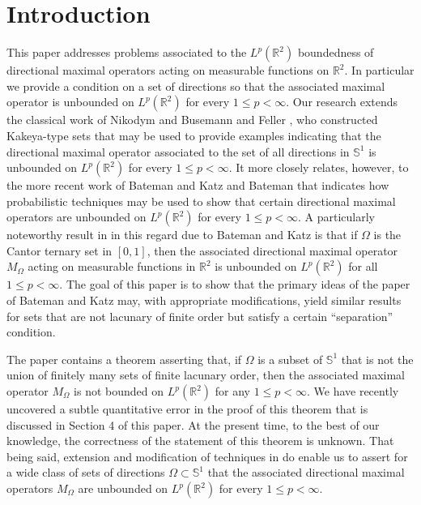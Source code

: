 \documentclass[12pt]{amsart}
\numberwithin{equation}{section}
\theoremstyle{definition}
\theoremstyle{remark}
\begin{document}
\section{Introduction}
This paper addresses problems associated to the $L^p(\mathbb{R}^2)$ boundedness of directional \mbox{maximal} operators acting on measurable functions on $\mathbb{R}^2$.  In particular we provide a condition on a set of directions so that the associated maximal operator is unbounded on $L^p(\mathbb{R}^2)$ for every $1 \leq p < \infty$.   Our research extends the classical work of Nikodym \cite{nikodym} and Busemann and Feller \cite{bf1934},  who constructed  Kakeya-type sets that may be used to provide examples indicating that the directional maximal operator associated to the set of all directions in $\mathbb{S}^{1}$ is unbounded on $L^p(\mathbb{R}^2)$ for every $1 \leq p < \infty$.  It more closely relates, however, to the more recent work of Bateman and Katz \cite{KB} and Bateman \cite{Ba} that indicates how probabilistic techniques  may be used to show that certain directional maximal operators are unbounded on $L^p(\mathbb{R}^2)$ for every $1 \leq p < \infty$.   A particularly noteworthy result in \cite{KB} in this regard due to Bateman and Katz is that if $\Omega$ is the Cantor ternary set in $[0,1]$, then the associated directional maximal operator $M_\Omega$ acting on measurable functions in $\mathbb{R}^2$ is unbounded on $L^p(\mathbb{R}^2)$ for all $1 \leq p < \infty$.   The goal of this paper is to show that the primary ideas of the paper of Bateman and Katz may, with appropriate modifications, yield similar results for  sets that are not lacunary of finite order but satisfy a certain ``separation'' condition.

The paper \cite{Ba} contains a theorem asserting that, if $\Omega$ is a subset of $\mathbb{S}^1$ that is not the union of finitely many sets of finite lacunary order, then the associated maximal operator $M_\Omega$ is not bounded on $L^p(\mathbb{R}^2)$ for any $1 \leq p < \infty$.   We have recently uncovered a subtle quantitative error in the proof of this theorem that is discussed in Section 4 of this paper.    At the present time, to the best of our knowledge, the correctness of the statement of this theorem is unknown.   That being said, extension and modification of techniques in \cite{Ba} do enable us to assert for a wide class of sets of directions $\Omega \subset \mathbb{S}^{1}$ that the associated directional maximal operators $M_\Omega$ are unbounded on $L^p(\mathbb{R}^2)$ for every $1 \leq p < \infty$.
\end{document}
